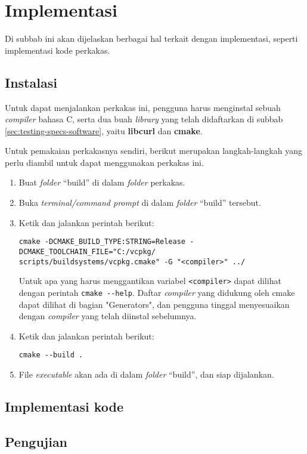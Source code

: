 \section{Implementasi}
\label{sec:testing-implementation}

Di subbab ini akan dijelaskan berbagai hal terkait dengan implementasi, seperti implementasi kode perkakas. 

\subsection{Instalasi}
\label{sec:testing-implementation-installation}

Untuk dapat menjalankan perkakas ini, pengguna harus menginstal sebuah \textit{compiler} bahasa C, serta dua buah \textit{library} yang telah didaftarkan di subbab \ref{sec:testing-specs-software}, yaitu \textbf{libcurl} dan \textbf{cmake}.

Untuk pemakaian perkakasnya sendiri, berikut merupakan langkah-langkah yang perlu diambil untuk dapat menggunakan perkakas \cl ini.

\begin{enumerate}
	\item Buat \textit{folder} ``build'' di dalam \textit{folder} perkakas.
	\item Buka \textit{terminal/command prompt} di dalam \textit{folder} ``build'' tersebut.
	\item Ketik dan jalankan perintah berikut:
	\begin{verbatim}
cmake -DCMAKE_BUILD_TYPE:STRING=Release -DCMAKE_TOOLCHAIN_FILE="C:/vcpkg/
scripts/buildsystems/vcpkg.cmake" -G "<compiler>" ../
	\end{verbatim}
	Untuk apa yang harus menggantikan variabel \verb|<compiler>| dapat dilihat dengan perintah \verb|cmake --help|. Daftar \textit{compiler} yang didukung oleh cmake dapat dilihat di bagian \mbox{"Generators"}, dan pengguna tinggal menyesuaikan dengan \textit{compiler} yang telah diinstal sebelumnya.
	\item Ketik dan jalankan perintah berikut:
	\begin{verbatim}
cmake --build .
	\end{verbatim}
	\item File \textit{executable} akan ada di dalam \textit{folder} ``build'', dan siap dijalankan.
\end{enumerate}

\subsection{Implementasi kode}
\label{sec:testing-implementation-code}

\subsection{Pengujian}
\label{sec:testing-experiments}
